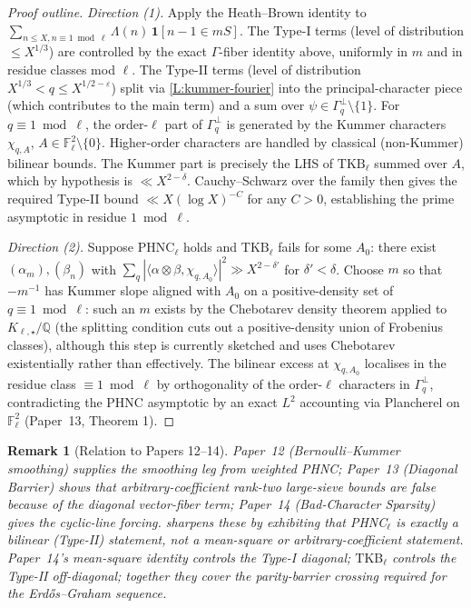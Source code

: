 \documentclass[11pt]{article}
\newtheorem{remark}{Remark}
\newcommand{\Q}{\mathbb Q}
\newcommand{\F}{\mathbb F}
\newcommand{\1}{\mathbf 1}
\begin{document}
\begin{proof}[Proof outline]
\emph{Direction (1).}  Apply the Heath--Brown identity to \(\sum_{n\le X,n\equiv 1\bmod\ell}\Lambda(n)\,\1[n-1\in mS]\).  The Type-I terms (level of distribution \(\le X^{1/3}\)) are controlled by the exact \(\Gamma\)-fiber identity above, uniformly in \(m\) and in residue classes mod \(\ell\).  The Type-II terms (level of distribution \(X^{1/3}<q\le X^{1/2-\varepsilon}\)) split via \cref{L:kummer-fourier} into the principal-character piece (which contributes to the main term) and a sum over \(\psi\in\Gamma_q^\perp\setminus\{1\}\).  For \(q\equiv 1\bmod\ell\), the order-\(\ell\) part of \(\Gamma_q^\perp\) is generated by the Kummer characters \(\chi_{q,A}\), \(A\in\F_\ell^2\setminus\{0\}\).  Higher-order characters are handled by classical (non-Kummer) bilinear bounds.  The Kummer part is precisely the LHS of \(\mathrm{TKB}_\ell\) summed over \(A\), which by hypothesis is \(\ll X^{2-\delta}\).  Cauchy--Schwarz over the family then gives the required Type-II bound \(\ll X(\log X)^{-C}\) for any \(C>0\), establishing the prime asymptotic in residue \(1\bmod\ell\).

\emph{Direction (2).}  Suppose \(\mathrm{PHNC}_\ell\) holds and \(\mathrm{TKB}_\ell\) fails for some \(A_0\): there exist \((\alpha_m),(\beta_n)\) with \(\sum_q|\langle\alpha\otimes\beta,\chi_{q,A_0}\rangle|^2\gg X^{2-\delta'}\) for \(\delta'<\delta\).  Choose \(m\) so that \(-m^{-1}\) has Kummer slope aligned with \(A_0\) on a positive-density set of \(q\equiv 1\bmod\ell\): such an \(m\) exists by the Chebotarev density theorem applied to \(K_{\ell,\star}/\Q\) (the splitting condition cuts out a positive-density union of Frobenius classes), although this step is currently sketched and uses Chebotarev existentially rather than effectively.  The bilinear excess at \(\chi_{q,A_0}\) localises in the residue class \(\equiv 1\bmod\ell\) by orthogonality of the order-\(\ell\) characters in \(\Gamma_q^\perp\), contradicting the PHNC asymptotic by an exact \(L^2\) accounting via Plancherel on \(\F_\ell^2\) (Paper~13, Theorem 1).
\end{proof}

\begin{remark}[Relation to Papers 12--14]
Paper~12 (Bernoulli--Kummer smoothing) supplies the smoothing leg from weighted PHNC; Paper~13 (Diagonal Barrier) shows that arbitrary-coefficient rank-two large-sieve bounds are false because of the diagonal vector-fiber term; Paper~14 (Bad-Character Sparsity) gives the cyclic-line forcing.   sharpens these by exhibiting that PHNC$_\ell$ is exactly a bilinear (Type-II) statement, not a mean-square or arbitrary-coefficient statement.  Paper~14's mean-square identity controls the Type-I diagonal; \(\mathrm{TKB}_\ell\) controls the Type-II off-diagonal; together they cover the parity-barrier crossing required for the Erd\H{o}s--Graham sequence.
\end{remark}
\end{document}
